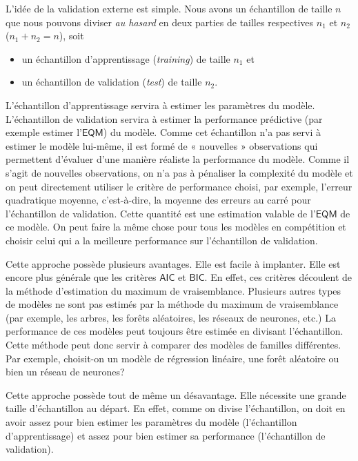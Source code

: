 \documentclass[
  11pt,
  letterpaper,
]{scrbook}
\providecommand{\tightlist}{%
  \setlength{\itemsep}{0pt}\setlength{\parskip}{0pt}}\usepackage{longtable,booktabs,array}
\theoremstyle{definition}
\theoremstyle{remark}
\begin{document}
L'idée de la validation externe est simple. Nous avons un échantillon de
taille \(n\) que nous pouvons diviser \emph{au hasard} en deux parties
de tailles respectives \(n_1\) et \(n_2\) (\(n_1+n_2=n\)), soit

\begin{itemize}
\tightlist
\item
  un échantillon d'apprentissage (\emph{training}) de taille \(n_1\) et
\item
  un échantillon de validation (\emph{test}) de taille \(n_2\).
\end{itemize}

L'échantillon d'apprentissage servira à estimer les paramètres du
modèle. L'échantillon de validation servira à estimer la performance
prédictive (par exemple estimer l'\(\mathsf{EQM}\)) du modèle. Comme cet
échantillon n'a pas servi à estimer le modèle lui-même, il est formé de
« nouvelles » observations qui permettent d'évaluer d'une manière
réaliste la performance du modèle. Comme il s'agit de nouvelles
observations, on n'a pas à pénaliser la complexité du modèle et on peut
directement utiliser le critère de performance choisi, par exemple,
l'erreur quadratique moyenne, c'est-à-dire, la moyenne des erreurs au
carré pour l'échantillon de validation. Cette quantité est une
estimation valable de l'\(\mathsf{EQM}\) de ce modèle. On peut faire la
même chose pour tous les modèles en compétition et choisir celui qui a
la meilleure performance sur l'échantillon de validation.

Cette approche possède plusieurs avantages. Elle est facile à implanter.
Elle est encore plus générale que les critères \(\mathsf{AIC}\) et
\(\mathsf{BIC}\). En effet, ces critères découlent de la méthode
d'estimation du maximum de vraisemblance. Plusieurs autres types de
modèles ne sont pas estimés par la méthode du maximum de vraisemblance
(par exemple, les arbres, les forêts aléatoires, les réseaux de
neurones, etc.) La performance de ces modèles peut toujours être estimée
en divisant l'échantillon. Cette méthode peut donc servir à comparer des
modèles de familles différentes. Par exemple, choisit-on un modèle de
régression linéaire, une forêt aléatoire ou bien un réseau de neurones?

Cette approche possède tout de même un désavantage. Elle nécessite une
grande taille d'échantillon au départ. En effet, comme on divise
l'échantillon, on doit en avoir assez pour bien estimer les paramètres
du modèle (l'échantillon d'apprentissage) et assez pour bien estimer sa
performance (l'échantillon de validation).
\end{document}
